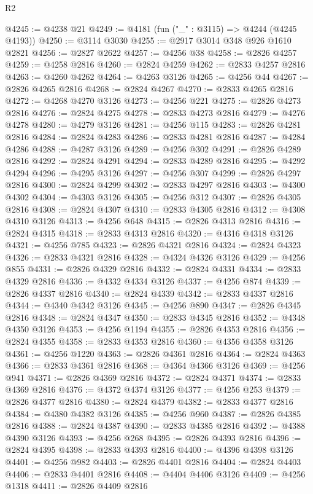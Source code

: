 \begin{lexlean}{R2}
\begin{coremodule}
@4245 := @4238 @21
@4249 := @4181 (fun ("_" : @3115) => @4244 (@4245 @4193))
@4250 := @3114 @3030
@4255 := @2917 @3014 @348 @926 @1610 @2821
@4256 := @2827 @2622
@4257 := @4256 @38
@4258 := @2826 @4257
@4259 := @4258 @2816
@4260 := @2824 @4259
@4262 := @2833 @4257 @2816
@4263 := @4260 @4262
@4264 := @4263 @3126
@4265 := @4256 @44
@4267 := @2826 @4265 @2816
@4268 := @2824 @4267
@4270 := @2833 @4265 @2816
@4272 := @4268 @4270 @3126
@4273 := @4256 @221
@4275 := @2826 @4273 @2816
@4276 := @2824 @4275
@4278 := @2833 @4273 @2816
@4279 := @4276 @4278
@4280 := @4279 @3126
@4281 := @4256 @115
@4283 := @2826 @4281 @2816
@4284 := @2824 @4283
@4286 := @2833 @4281 @2816
@4287 := @4284 @4286
@4288 := @4287 @3126
@4289 := @4256 @302
@4291 := @2826 @4289 @2816
@4292 := @2824 @4291
@4294 := @2833 @4289 @2816
@4295 := @4292 @4294
@4296 := @4295 @3126
@4297 := @4256 @307
@4299 := @2826 @4297 @2816
@4300 := @2824 @4299
@4302 := @2833 @4297 @2816
@4303 := @4300 @4302
@4304 := @4303 @3126
@4305 := @4256 @312
@4307 := @2826 @4305 @2816
@4308 := @2824 @4307
@4310 := @2833 @4305 @2816
@4312 := @4308 @4310 @3126
@4313 := @4256 @648
@4315 := @2826 @4313 @2816
@4316 := @2824 @4315
@4318 := @2833 @4313 @2816
@4320 := @4316 @4318 @3126
@4321 := @4256 @785
@4323 := @2826 @4321 @2816
@4324 := @2824 @4323
@4326 := @2833 @4321 @2816
@4328 := @4324 @4326 @3126
@4329 := @4256 @855
@4331 := @2826 @4329 @2816
@4332 := @2824 @4331
@4334 := @2833 @4329 @2816
@4336 := @4332 @4334 @3126
@4337 := @4256 @874
@4339 := @2826 @4337 @2816
@4340 := @2824 @4339
@4342 := @2833 @4337 @2816
@4344 := @4340 @4342 @3126
@4345 := @4256 @890
@4347 := @2826 @4345 @2816
@4348 := @2824 @4347
@4350 := @2833 @4345 @2816
@4352 := @4348 @4350 @3126
@4353 := @4256 @1194
@4355 := @2826 @4353 @2816
@4356 := @2824 @4355
@4358 := @2833 @4353 @2816
@4360 := @4356 @4358 @3126
@4361 := @4256 @1220
@4363 := @2826 @4361 @2816
@4364 := @2824 @4363
@4366 := @2833 @4361 @2816
@4368 := @4364 @4366 @3126
@4369 := @4256 @941
@4371 := @2826 @4369 @2816
@4372 := @2824 @4371
@4374 := @2833 @4369 @2816
@4376 := @4372 @4374 @3126
@4377 := @4256 @253
@4379 := @2826 @4377 @2816
@4380 := @2824 @4379
@4382 := @2833 @4377 @2816
@4384 := @4380 @4382 @3126
@4385 := @4256 @960
@4387 := @2826 @4385 @2816
@4388 := @2824 @4387
@4390 := @2833 @4385 @2816
@4392 := @4388 @4390 @3126
@4393 := @4256 @268
@4395 := @2826 @4393 @2816
@4396 := @2824 @4395
@4398 := @2833 @4393 @2816
@4400 := @4396 @4398 @3126
@4401 := @4256 @982
@4403 := @2826 @4401 @2816
@4404 := @2824 @4403
@4406 := @2833 @4401 @2816
@4408 := @4404 @4406 @3126
@4409 := @4256 @1318
@4411 := @2826 @4409 @2816

\end{coremodule}
\end{lexlean}
